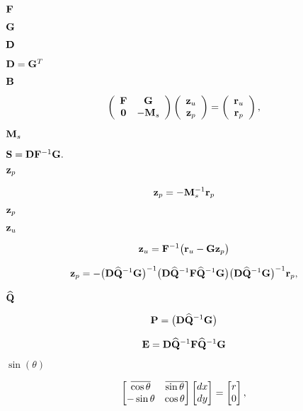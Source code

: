 \documentclass{article}
\begin{document}
$ {\bf F}$
\pagebreak

$ {\bf G} $
\pagebreak

$ {\bf D}$
\pagebreak

$ {\bf D} = {\bf G}^T $
\pagebreak

$ {\bf B} $
\pagebreak

\[ \left( \begin{array}{cc} {\bf F} & {\bf G} \\ {\bf 0} & -{\bf M}_s \end{array} \right) \left( \begin{array}{c} {\bf z}_u \\ {\bf z}_p \end{array} \right) = \left( \begin{array}{c} {\bf r}_u \\ {\bf r}_p \end{array} \right), \]
\pagebreak

${\bf M}_s$
\pagebreak

$ {\bf S} = {\bf D} {\bf F}^{-1}{\bf G}. $
\pagebreak

$ {\bf z}_p$
\pagebreak

\[ {\bf z}_p = - {\bf M}_s^{-1} {\bf r}_p \]
\pagebreak

$ {\bf z}_p $
\pagebreak

$ {\bf z}_u$
\pagebreak

\[ {\bf z}_u = {\bf F}^{-1} \big( {\bf r}_u - {\bf G} {\bf z}_p \big) \]
\pagebreak

\[ {\bf z}_p = - \big({\bf D} \widehat{\bf Q}^{-1}{\bf G} \big)^{-1} \big({\bf D} \widehat{\bf Q}^{-1}{\bf F} \widehat{\bf Q}^{-1}{\bf G}\big) \big({\bf D} \widehat{\bf Q}^{-1}{\bf G} \big)^{-1} {\bf r}_p, \]
\pagebreak

$ \widehat{\bf Q} $
\pagebreak

\[ {\bf P} = \big({\bf D} \widehat{\bf Q}^{-1}{\bf G} \big) \]
\pagebreak

\[ {\bf E}={\bf D}\widehat{\bf Q}^{-1}{\bf F}\widehat{\bf Q}^{-1}{\bf G} \]
\pagebreak

$ \sin(\theta) $
\pagebreak

\[ \begin{bmatrix} \overline{\cos\theta} & \overline{\sin\theta} \cr -\sin\theta & \cos\theta \end{bmatrix} \begin{bmatrix} dx \\ dy \end{bmatrix} = \begin{bmatrix} r \\ 0 \end{bmatrix}, \]
\pagebreak
\end{document}
